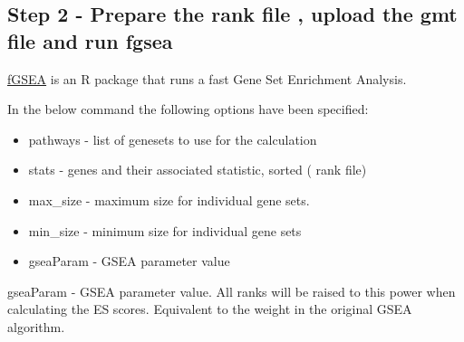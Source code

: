 \documentclass[
]{book}
\providecommand{\tightlist}{%
  \setlength{\itemsep}{0pt}\setlength{\parskip}{0pt}}
\newenvironment{rmd-caution}{\begin{tcolorbox}[colback=orange!5,colframe=orange!75!black,title=Caution]}{\end{tcolorbox}}
\begin{document}
\subsection{Step 2 - Prepare the rank file , upload the gmt file and run fgsea}\label{step-2---prepare-the-rank-file-upload-the-gmt-file-and-run-fgsea}

\href{https://bioconductor.org/packages/release/bioc/html/fgsea.html}{fGSEA} is an R package that runs a fast Gene Set Enrichment Analysis.

In the below command the following options have been specified:

\begin{itemize}
\tightlist
\item
  pathways - list of genesets to use for the calculation
\item
  stats - genes and their associated statistic, sorted ( rank file)
\item
  max\_size - maximum size for individual gene sets.
\item
  min\_size - minimum size for individual gene sets
\item
  gseaParam - GSEA parameter value
\end{itemize}

\begin{rmd-caution}
gseaParam - GSEA parameter value. All ranks will be raised to this power
when calculating the ES scores. Equivalent to the weight in the original
GSEA algorithm.
\end{rmd-caution}
\end{document}
